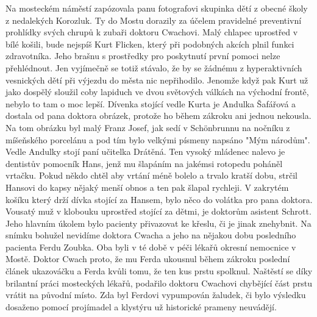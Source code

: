 
Na mosteckém náměstí zapózovala panu fotografovi skupinka dětí z
obecné školy z nedalekých Korozluk. Ty do Mostu dorazily za účelem
pravidelné preventivní prohlídky svých chrupů k zubaři doktoru
Cwachovi. Malý chlapec uprostřed v bílé košili, bude nejspíš Kurt
Flicken, který při podobných akcích plnil funkci zdravotníka. Jeho
brašnu s prostředky pro poskytnutí první pomoci nelze přehlédnout. Jen
vyjímečně se totiž stávalo, že by se žádnému z hyperaktivních
vesnických dětí při výjezdu do města nic nepřihodilo. Jenomže když pak
Kurt už jako dospělý sloužil coby lapiduch ve dvou světových válkách
na východní frontě, nebylo to tam o moc lepší. Dívenka stojící vedle
Kurta je Andulka Šafářová a dostala od pana doktora obrázek, protože
ho během zákroku ani jednou nekousla. Na tom obrázku byl malý Franz
Josef, jak sedí v Schönbrunnu na nočníku z míšeňského porcelánu a pod
tím bylo velkými písmeny napsáno "Mým národům". Vedle Andulky stojí
paní učitelka Drátěná. Ten vysoký mládenec nalevo je dentistův
pomocník Hans, jenž mu šlapáním na jakémsi rotopedu poháněl vrtačku.
Pokud někdo chtěl aby vrtání méně bolelo a trvalo kratší dobu, strčil
Hansovi do kapsy nějaký menší obnos a ten pak šlapal rychleji. V
zakrytém košíku který drží dívka stojící za Hansem, bylo něco do
volátka pro pana doktora. Vousatý muž v klobouku uprostřed stojící za
dětmi, je doktorům asistent Schrott. Jeho hlavním úkolem bylo pacienty
přivazovat ke křeslu, či je jinak znehybnit. Na snímku bohužel
nevidíme doktora Cwacha a jeho na nějakou dobu posledního pacienta
Ferdu Zoubka. Oba byli v té době v péči lékařů okresní nemocnice v
Mostě. Doktor Cwach proto, že mu Ferda ukousnul během zákroku poslední
článek ukazováčku a Ferda kvůli tomu, že ten kus prstu spolknul.
Naštěstí se díky brilantní práci mosteckých lékařů, podařilo doktoru
Cwachovi chybějící část prstu vrátit na původní místo. Zda byl Ferdovi
vypumpován žaludek, či bylo výsledku dosaženo pomocí projímadel a
klystýru už historické prameny neuvádějí.
